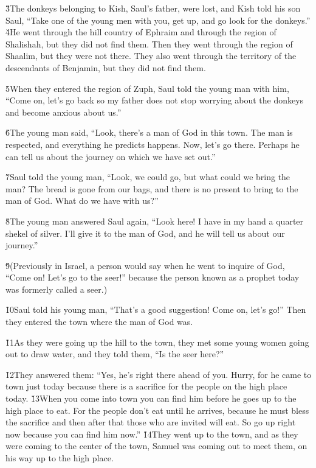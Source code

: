 \v{3}The donkeys belonging to Kish, Saul's father, were lost, and Kish told his son Saul, ``Take one of the young men with you, get up, and go look for the donkeys.'' \v{4}He went through the hill country of Ephraim and through the region of Shalishah, but they did not find them. Then they went through the region of Shaalim, but they were not there. They also went through the territory of the descendants of Benjamin, but they did not find them.

\v{5}When they entered the region of Zuph, Saul told the young man with him, ``Come on, let's go back so my father does not stop worrying about the donkeys and become anxious about us.''

\v{6}The young man said, ``Look, there's a man of God in this town. The man is respected, and everything he predicts happens. Now, let's go there. Perhaps he can tell us about the journey on which we have set out.''

\v{7}Saul told the young man, ``Look, we could go, but what could we bring the man? The bread is gone from our bags, and there is no present to bring to the man of God. What do we have with us?''

\v{8}The young man answered Saul again, ``Look here! I have in my hand a quarter shekel of silver. I'll give it to the man of God, and he will tell us about our journey.''

\v{9}(Previously in Israel, a person would say when he went to inquire of God, ``Come on! Let's go to the seer!'' because the person known as a prophet today was formerly called a seer.)

\v{10}Saul told his young man, ``That's a good suggestion! Come on, let's go!'' Then they entered the town where the man of God was.

\v{11}As they were going up the hill to the town, they met some young women going out to draw water, and they told them, ``Is the seer here?''

\v{12}They answered them: ``Yes, he's right there ahead of you. Hurry, for he came to town just today because there is a sacrifice for the people on the high place today. \v{13}When you come into town you can find him before he goes up to the high place to eat. For the people don't eat until he arrives, because he must bless the sacrifice and then after that those who are invited will eat. So go up right now because you can find him now.'' \v{14}They went up to the town, and as they were coming to the center of the town, Samuel was coming out to meet them, on his way up to the high place.

